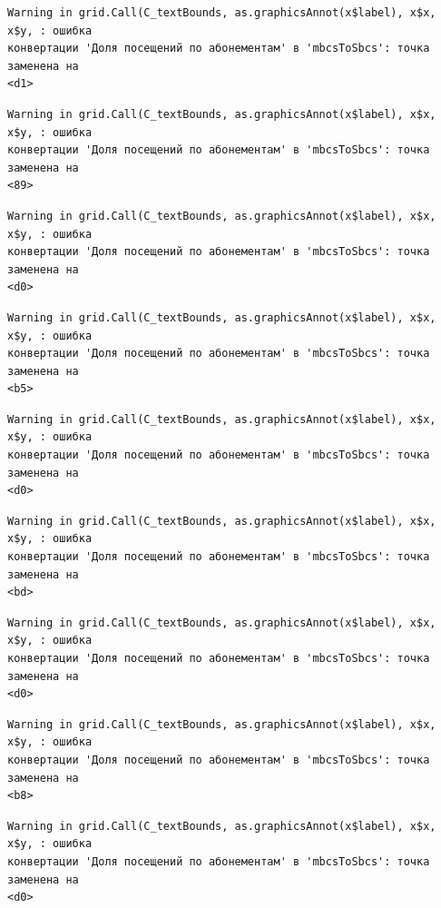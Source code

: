 \documentclass[
  letterpaper,
  DIV=11,
  numbers=noendperiod]{scrreprt}
\begin{document}
\begin{verbatim}
Warning in grid.Call(C_textBounds, as.graphicsAnnot(x$label), x$x, x$y, : ошибка
конвертации 'Доля посещений по абонементам' в 'mbcsToSbcs': точка заменена на
<d1>
\end{verbatim}

\begin{verbatim}
Warning in grid.Call(C_textBounds, as.graphicsAnnot(x$label), x$x, x$y, : ошибка
конвертации 'Доля посещений по абонементам' в 'mbcsToSbcs': точка заменена на
<89>
\end{verbatim}

\begin{verbatim}
Warning in grid.Call(C_textBounds, as.graphicsAnnot(x$label), x$x, x$y, : ошибка
конвертации 'Доля посещений по абонементам' в 'mbcsToSbcs': точка заменена на
<d0>
\end{verbatim}

\begin{verbatim}
Warning in grid.Call(C_textBounds, as.graphicsAnnot(x$label), x$x, x$y, : ошибка
конвертации 'Доля посещений по абонементам' в 'mbcsToSbcs': точка заменена на
<b5>
\end{verbatim}

\begin{verbatim}
Warning in grid.Call(C_textBounds, as.graphicsAnnot(x$label), x$x, x$y, : ошибка
конвертации 'Доля посещений по абонементам' в 'mbcsToSbcs': точка заменена на
<d0>
\end{verbatim}

\begin{verbatim}
Warning in grid.Call(C_textBounds, as.graphicsAnnot(x$label), x$x, x$y, : ошибка
конвертации 'Доля посещений по абонементам' в 'mbcsToSbcs': точка заменена на
<bd>
\end{verbatim}

\begin{verbatim}
Warning in grid.Call(C_textBounds, as.graphicsAnnot(x$label), x$x, x$y, : ошибка
конвертации 'Доля посещений по абонементам' в 'mbcsToSbcs': точка заменена на
<d0>
\end{verbatim}

\begin{verbatim}
Warning in grid.Call(C_textBounds, as.graphicsAnnot(x$label), x$x, x$y, : ошибка
конвертации 'Доля посещений по абонементам' в 'mbcsToSbcs': точка заменена на
<b8>
\end{verbatim}

\begin{verbatim}
Warning in grid.Call(C_textBounds, as.graphicsAnnot(x$label), x$x, x$y, : ошибка
конвертации 'Доля посещений по абонементам' в 'mbcsToSbcs': точка заменена на
<d0>
\end{verbatim}
\end{document}

